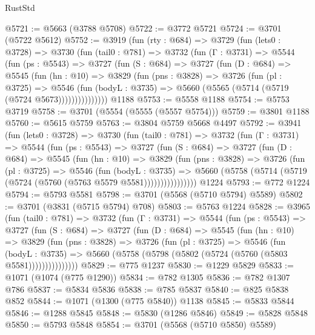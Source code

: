 \begin{lexlean}{RustStd}
\begin{coremodule}
@5721 := @5663 (@3788 @5708)
@5722 := @3772 @5721
@5724 := @3701 (@5722 @5612)
@5752 := @3919
    (fun (rty : @684) =>
    @3729
      (fun (lets0 : @3728) =>
      @3730
        (fun (tail0 : @781) =>
        @3732
          (fun (Γ : @3731) =>
          @5544
            (fun (ps : @5543) =>
            @3727
              (fun (S : @684) =>
              @3727
                (fun (D : @684) =>
                @5545
                  (fun (hn : @10) =>
                  @3829
                    (fun (pns : @3828) =>
                    @3726
                      (fun (pl : @3725) =>
                      @5546
                        (fun (bodyL : @3735) =>
                        @5660 (@5565 (@5714 (@5719 (@5724 @5673)))))))))))))))
    @1188
@5753 := @5558 @1188
@5754 := @5753 @3719
@5758 := @3701 (@5554 (@5555 (@5557 @5754)))
@5759 := @3801 @1188
@5760 := @5615 @5759
@5763 := @3804 @5759 @5668 @4497
@5792 := @3941
    (fun (lets0 : @3728) =>
    @3730
      (fun (tail0 : @781) =>
      @3732
        (fun (Γ : @3731) =>
        @5544
          (fun (ps : @5543) =>
          @3727
            (fun (S : @684) =>
            @3727
              (fun (D : @684) =>
              @5545
                (fun (hn : @10) =>
                @3829
                  (fun (pns : @3828) =>
                  @3726
                    (fun (pl : @3725) =>
                    @5546
                      (fun (bodyL : @3735) =>
                      @5660 (@5758 (@5714 (@5719 (@5724 (@5760 (@5763 @5579 @5581))))))))))))))))
    @1224
@5793 := @772 @1224
@5794 := @5793 @5581
@5798 := @3701 (@5568 (@5710 @5794) @5589)
@5802 := @3701 (@3831 (@5715 @5794) @708)
@5803 := @5763 @1224
@5828 := @3965
    (fun (tail0 : @781) =>
    @3732
      (fun (Γ : @3731) =>
      @5544
        (fun (ps : @5543) =>
        @3727
          (fun (S : @684) =>
          @3727
            (fun (D : @684) =>
            @5545
              (fun (hn : @10) =>
              @3829
                (fun (pns : @3828) =>
                @3726
                  (fun (pl : @3725) =>
                  @5546
                    (fun (bodyL : @3735) =>
                    @5660 (@5758 (@5798 (@5802 (@5724 (@5760 (@5803 @5581)))))))))))))))
@5829 := @775 @1237
@5830 := @1229 @5829
@5833 := @1071 (@1074 (@775 @1290))
@5834 := @782 @1305
@5836 := @782 @1307 @786
@5837 := @5834 @5836
@5838 := @785 @5837
@5840 := @825 @5838 @852
@5844 := @1071 (@1300 (@775 @5840)) @1138
@5845 := @5833 @5844
@5846 := @1288 @5845
@5848 := @5830 (@1286 @5846)
@5849 := @5828 @5848
@5850 := @5793 @5848
@5854 := @3701 (@5568 (@5710 @5850) @5589)

\end{coremodule}
\end{lexlean}
